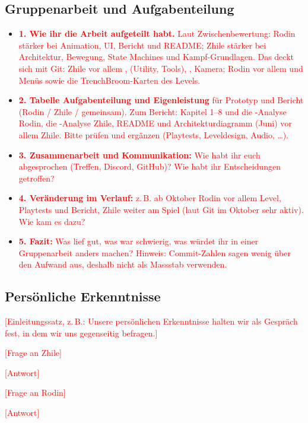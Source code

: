 \documentclass[../Main.tex]{subfiles}
\begin{document}
\subsection{Gruppenarbeit und Aufgabenteilung}

\begin{itemize}[leftmargin=1.5cm]
    \item \textcolor{red}{\textbf{1. Wie ihr die Arbeit aufgeteilt habt.} Laut Zwischenbewertung: Rodin stärker bei Animation, UI, Bericht und README; Zhile stärker bei Architektur, Bewegung, State Machines und Kampf-Grundlagen. Das deckt sich mit Git: Zhile vor allem ,  (Utility, Tools), , Kamera; Rodin vor allem  und Menüs sowie die TrenchBroom-Karten des Levels.}
    \item \textcolor{red}{\textbf{2. Tabelle Aufgabenteilung und Eigenleistung} für Prototyp und Bericht (Rodin / Zhile / gemeinsam). Zum Bericht: Kapitel 1--8 und die -Analyse Rodin, die -Analyse Zhile, README und Architekturdiagramm (Juni) vor allem Zhile. Bitte prüfen und ergänzen (Playtests, Leveldesign, Audio, \ldots).}
    \item \textcolor{red}{\textbf{3. Zusammenarbeit und Kommunikation:} Wie habt ihr euch abgesprochen (Treffen, Discord, GitHub)? Wie habt ihr Entscheidungen getroffen?}
    \item \textcolor{red}{\textbf{4. Veränderung im Verlauf:} z.\,B. ab Oktober Rodin vor allem Level, Playtests und Bericht, Zhile weiter am Spiel (laut Git im Oktober sehr aktiv). Wie kam es dazu?}
    \item \textcolor{red}{\textbf{5. Fazit:} Was lief gut, was war schwierig, was würdet ihr in einer Gruppenarbeit anders machen? Hinweis: Commit-Zahlen sagen wenig über den Aufwand aus, deshalb nicht als Massstab verwenden.}
\end{itemize}

\subsection{Persönliche Erkenntnisse}

\textcolor{red}{[Einleitungssatz, z.\,B.: Unsere persönlichen Erkenntnisse halten wir als Gespräch fest, in dem wir uns gegenseitig befragen.]}

\begin{description}[style=unboxed, leftmargin=0cm, itemsep=0.5em]
    \item[Rodin:] \textcolor{red}{[Frage an Zhile]}
    \item[Zhile:] \textcolor{red}{[Antwort]}
    \item[Zhile:] \textcolor{red}{[Frage an Rodin]}
    \item[Rodin:] \textcolor{red}{[Antwort]}
\end{description}
\end{document}
